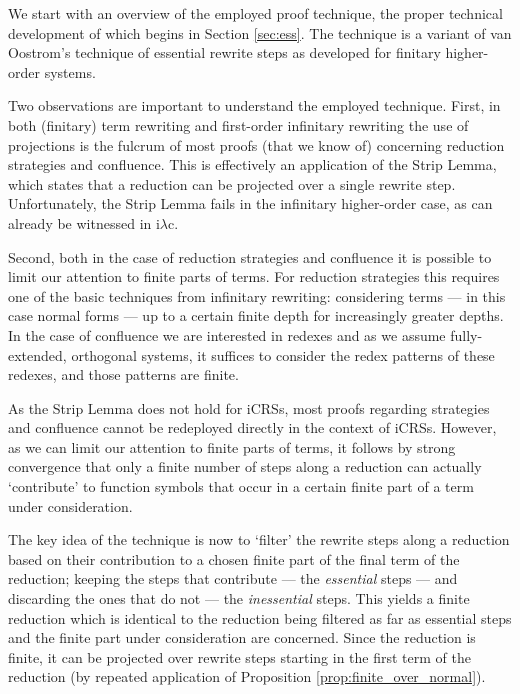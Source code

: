 \documentclass{LMCS}
\theoremstyle{definition}
\newcommand{\iLC}{i$\lambda$c\xspace}
\begin{document}
We start with an overview of the employed proof technique, the proper technical development of which begins in Section \ref{sec:ess}. The technique is a variant of van Oostrom's technique of essential rewrite steps \cite{O99} as developed for finitary higher-order systems.

Two observations are important to understand the employed technique. First, in both (finitary) term rewriting and first-order infinitary rewriting the use of projections is the fulcrum of most proofs (that we know of) concerning reduction strategies and confluence. This is effectively an application of the Strip Lemma, which states that a reduction can be projected over a single rewrite step. Unfortunately, the Strip Lemma fails in the infinitary higher-order case, as can already be witnessed in \iLC \cite{KKSV97,T03_KV}.

Second, both in the case of reduction strategies and confluence it is possible to limit our attention to finite parts of terms. For reduction strategies this requires one of the basic techniques from infinitary rewriting: considering terms --- in this case normal forms --- up to a certain finite depth for increasingly greater depths. In the case of confluence we are interested in redexes and as we assume fully-extended, orthogonal systems, it suffices to consider the redex patterns of these redexes, and those patterns are finite.

As the Strip Lemma does not hold for iCRSs, most proofs regarding strategies and confluence cannot be redeployed directly in the context of iCRSs. However, as we can limit our attention to finite parts of terms, it follows by strong convergence that only a finite number of steps along a reduction can actually `contribute' to function symbols that occur in a certain finite part of a term under consideration.

The key idea of the technique is now to `filter' the rewrite steps along a reduction based on their contribution to a chosen finite part of the final term of the reduction; keeping the steps that contribute --- the \emph{essential} steps --- and discarding the ones that do not --- the \emph{inessential} steps. This yields a finite reduction which is identical to the reduction being filtered as far as essential steps and the finite part under consideration are concerned. Since the reduction is finite, it can be projected over rewrite steps starting in the first term of the reduction (by repeated application of Proposition \ref{prop:finite_over_normal}).
\end{document}
